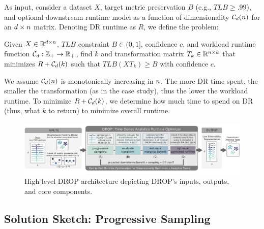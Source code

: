 As input, consider a dataset $X$, target metric preservation $B$ (e.g., $TLB \geq .99$), and optional downstream runtime model as a function of dimensionality $\mathcal{C}_{\color{black}d}({\color{black}n})$ for an ${\color{black}d}\times {\color{black}n}$ matrix.  
Denoting DR runtime as $R$, we define the problem:
\begin{problem}
\label{def:opt}
  Given $X \in \mathbb{R}^{{\color{black}d} \times {\color{black}n}}$, $TLB$ constraint $B \in 
  (0, 1]$, confidence $c$, and workload runtime function $\mathcal{C}_{\color{black}d}:\mathbb{Z}_{+} \rightarrow \mathbb{R}_{+}$, find $k$ and transformation
  matrix $T_k \in \mathbb{R}^{{\color{black}n} \times k}$ that minimizes $R + \mathcal{C}_{\color{black}d}(k)$
  such that $TLB(XT_k) \geq B$ with confidence $c$.
\end{problem}

We assume $\mathcal{C}_{\color{black}d}({\color{black}n})$ is monotonically increasing in ${\color{black}n}$.
The more DR time spent, the smaller the transformation (as in the case study), thus the lower the workload runtime.
To minimize $R + \mathcal{C}_{\color{black}d}(k)$, we  determine how much time to spend on DR (thus, what $k$ to return) to minimize overall runtime.

\begin{figure}
\begin{center}
\includegraphics[width=\textwidth]{figs/system_arch.pdf}\vspace{-1em}
\caption[]{High-level DROP architecture depicting DROP's inputs, outputs, and core components.}
\end{center}
\vspace{-1em}
\label{fig:arch}
\end{figure}


\subsection{Solution Sketch: Progressive Sampling}
\label{sec:sampling}


